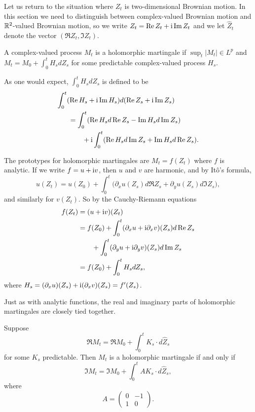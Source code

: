 Let us return to the situation where $Z_t$ is two-dimensional Brownian motion. In this section we need to distinguish between complex-valued Brownian motion and $\mathbb{R}^2$-valued Brownian motion, so we write $Z_t = \operatorname{Re} Z_t + \mathrm{i}\operatorname{Im} Z_t$ and we let $\widehat{Z}_t$ denote the vector $(\Re Z_t, \Im Z_t)$.


\begin{definition}\label{def:ch5_6.4}
A complex-valued process $M_t$ is a holomorphic martingale if $\sup_t |M_t| \in L^p$ and $M_t = M_0 + \int_0^t H_s dZ_s$ for some predictable complex-valued process $H_s$.
\end{definition}

As one would expect, $\int_0^t H_s dZ_s$ is defined to be
\mpagebreak
\begin{align}\label{eq:ch5_6.3}
    \int_0^t (\!&\operatorname{Re} H_s + \mathrm{i}\operatorname{Im} H_s)d(\operatorname{Re} Z_s + \mathrm{i}\operatorname{Im} Z_s) \\
    &= \int_0^t (\operatorname{Re} H_s d\operatorname{Re} Z_s - \operatorname{Im} H_s d\operatorname{Im} Z_s) \notag \\
    &\qquad+ \mathrm{i}\int_0^t (\operatorname{Re} H_s d\operatorname{Im} Z_s + \operatorname{Im} H_s d\operatorname{Re} Z_s). \notag
\end{align}

The prototypes for holomorphic martingales are $M_t = f(Z_t)$ where $f$ is analytic. If we write $f = u + \mathrm{i} v$, then $u$ and $v$ are harmonic, and by It\^o's formula,
\[
    u(Z_t) = u(Z_0) + \int_0^t \big(\partial_x u(Z_s)d\Re Z_s + \partial_y u(Z_s)d\Im Z_s\big),
\]
and similarly for $v(Z_t)$. So by the Cauchy-Riemann equations
\begin{align}\label{eq:ch5_6.4}
    f(Z_t) &= (u + \mathrm{i} v)(Z_t) \\
    &= f(Z_0) + \int_0^t (\partial_x u + \mathrm{i}\partial_x v)(Z_s)d\operatorname{Re} Z_s \notag \\
    &\qquad+ \int_0^t (\partial_y u + \mathrm{i}\partial_y v)(Z_s)d\operatorname{Im} Z_s \notag \\
    &= f(Z_0) + \int_0^t H_s dZ_s, \notag
\end{align}
where $H_s = (\partial_x u)(Z_s) + \mathrm{i}(\partial_x v)(Z_s) = f'(Z_s)$.

Just as with analytic functions, the real and imaginary parts of holomorphic martingales are closely tied together.

\begin{lemma}\label{lem:ch5_6.5}
Suppose
\begin{equation}\label{eq:ch5_6.5}
    \Re M_t = \Re M_0 + \int_0^t K_s \cdot d\widehat{Z}_s
\end{equation}
for some $K_s$ predictable. Then $M_t$ is a holomorphic martingale if and only if
\begin{equation}\label{eq:ch5_6.6}
    \Im M_t = \Im M_0 + \int_0^t AK_s \cdot d\widehat{Z}_s,
\end{equation}
where
\begin{equation}\label{eq:ch5_6.7}
A = \begin{pmatrix} 0 & -1 \\ 1 & 0 \end{pmatrix}.
\end{equation}
\end{lemma}

